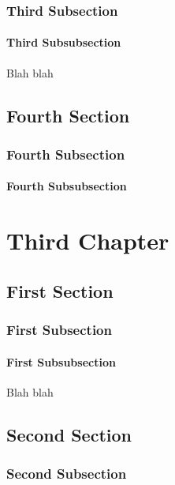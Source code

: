 \documentclass[11pt]{book}
\begin{document}
\subsection{Third Subsection}

\subsubsection{Third Subsubsection}

Blah blah

\section{Fourth Section}

\subsection{Fourth Subsection}

\subsubsection{Fourth Subsubsection}

\chapter{Third Chapter}

\section{First Section}

\subsection{First Subsection}

\subsubsection{First Subsubsection}

Blah blah

\section{Second Section}

\subsection{Second Subsection}
\end{document}
